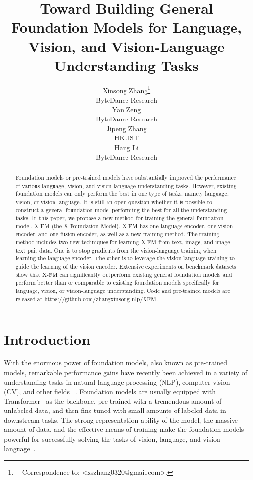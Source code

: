 \documentclass[11pt]{article}
\title{Toward Building General Foundation Models for Language, Vision, and Vision-Language Understanding Tasks}
\author{Xinsong Zhang\thanks{\ \ Correspondence to: <xszhang0320@gmail.com>.}  \\
  ByteDance Research \\   
  \And
  Yan Zeng \\
  ByteDance Research \\ \And
  Jipeng Zhang \\
  HKUST \\ \And
  Hang Li \\
  ByteDance Research \\
  }
\newcommand{\ModelName}{X-FM\xspace}
\begin{document}
\maketitle

\begin{abstract}
Foundation models or pre-trained models have substantially improved the performance of various language, vision, and vision-language understanding tasks. However, existing foundation models can only perform the best in one type of tasks, namely language, vision, or vision-language. 
It is still an open question whether it is possible to construct a general foundation model performing the best for all the understanding tasks. In this paper, we propose a new method for training the general foundation model, {\ModelName} (the X-Foundation Model).  {\ModelName} has one language encoder, one vision encoder, and one fusion encoder, as well as a new training method. The training method includes two new techniques for learning {\ModelName} from text, image, and image-text pair data. One is to stop gradients from the vision-language training when learning the language encoder. The other is to leverage the vision-language training to guide the learning of the vision encoder. Extensive experiments on benchmark datasets show that {\ModelName} can significantly outperform existing general foundation models and perform better than or comparable to existing foundation models specifically for language, vision, or vision-language understanding. 
Code and pre-trained models are released at \url{https://github.com/zhangxinsong-nlp/XFM}.

\end{abstract}

 \setlength{\parskip}{0.55ex}
\vspace{-0.3em}
\section{Introduction}
\label{sec:intro}
With the enormous power of foundation models, also known as pre-trained models, remarkable performance gains have recently been achieved in a variety of understanding tasks in natural language processing (NLP), computer vision (CV), and other fields~\citep{devlin2018bert,liu2019roberta,lewis2019bart,raffel2020exploring,brown2020language,dosovitskiy2020image,he2022masked,bao2021beit,lu2019vilbert,tan-bansal-2019-lxmert,chen2020uniter,li2020oscar,li2021align,zeng2021multi,zeng2022x}
. Foundation models are usually equipped with Transformer~\citep{vaswani2017attention} as the backbone, pre-trained with a tremendous amount of unlabeled data, and then fine-tuned with small amounts of labeled data in downstream tasks. The strong representation ability of the model, the massive amount of data, and the effective means of training make the foundation models powerful for successfully solving the tasks of vision, language, and vision-language~\citep{li2020unimo,li2021unimo,singh2021flava,DBLP:journals/corr/abs-2108-10904,wang2022ofa,diao2022prefix,wang2022omnivl}.
\end{document}
